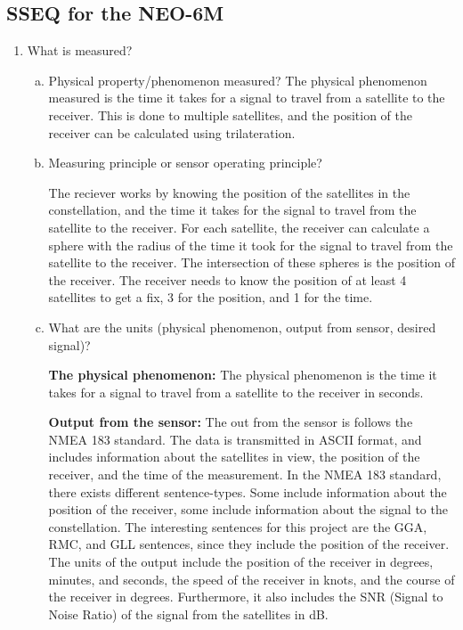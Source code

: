 \subsection{SSEQ for the NEO-6M}
\begin{enumerate}
    \item What is measured?
    \begin{enumerate}[(a)]
        \item Physical property/phenomenon measured?
        The physical phenomenon measured is the time it takes for a signal to travel from a satellite to the receiver.
        This is done to multiple satellites, and the position of the receiver can be calculated using trilateration.

        \item Measuring principle or sensor operating principle?

        The reciever works by knowing the position of the satellites in the constellation, and the time it takes for the signal to travel from the satellite to the receiver.
        For each satellite, the receiver can calculate a sphere with the radius of the time it took for the signal to travel from the satellite to the receiver.
        The intersection of these spheres is the position of the receiver.
        The receiver needs to know the position of at least 4 satellites to get a fix, 3 for the position, and 1 for the time.


        \item What are the units (physical phenomenon, output from sensor, desired signal)?

        \textbf{The physical phenomenon:}
        The physical phenomenon is the time it takes for a signal to travel from a satellite to the receiver in seconds.

        \textbf{Output from the sensor:}
        The out from the sensor is follows the NMEA 183 standard.
        The data is transmitted in ASCII format, and includes information about the satellites in view, the position of the receiver, and the time of the measurement.
        In the NMEA 183 standard, there exists different sentence-types.
        Some include information about the position of the receiver, some include information about the signal to the constellation.
        The interesting sentences for this project are the GGA, RMC, and GLL sentences, since they include the position of the receiver.
        The units of the output include the position of the receiver in degrees, minutes, and seconds, the speed of the receiver in knots, and the course of the receiver in degrees.
        Furthermore, it also includes the SNR (Signal to Noise Ratio) of the signal from the satellites in dB.



\end{enumerate}
\end{enumerate}

